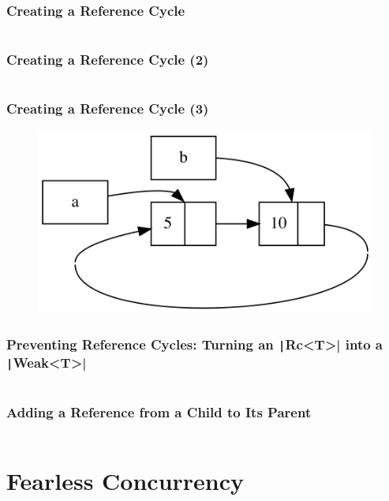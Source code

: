 \documentclass{beamer}
\begin{document}
\begin{frame}[fragile]
	\frametitle{Creating a Reference Cycle}
	\inputminted[fontsize=\scriptsize]{rust}{./code/smart13.rs}
\end{frame} 

\begin{frame}[fragile]
	\frametitle{Creating a Reference Cycle (2)}
	\inputminted[fontsize=\scriptsize]{rust}{./code/smart14.rs}
\end{frame} 


\begin{frame}[fragile]
	\frametitle{Creating a Reference Cycle (3)}
	\begin{figure}
		\centering
		\includegraphics[width=0.99\linewidth]{img/trpl15-04}
	\end{figure}
	
\end{frame} 

\begin{frame}[fragile]
	\frametitle{Preventing Reference Cycles: Turning an \texttt|Rc<T>|  into a \texttt|Weak<T>|}
	\inputminted[fontsize=\scriptsize]{rust}{./code/smart15.rs}
\end{frame} 


\begin{frame}[fragile]
	\frametitle{Adding a Reference from a Child to Its Parent}
	\inputminted[fontsize=\scriptsize]{rust}{./code/smart16.rs}
\end{frame} 


\section{Fearless Concurrency}
\end{document}
